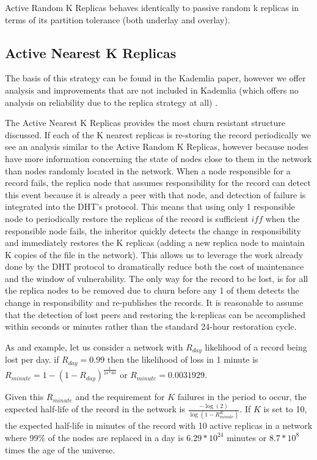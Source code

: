 \documentclass[conference]{IEEEtran}
\begin{document}
Active Random K Replicas behaves identically to passive random k replicas in terms of its partition tolerance (both underlay and overlay).





\subsection{Active Nearest K Replicas}
The basis of this strategy can be found in the Kademlia\cite{kademlia} paper, however we offer analysis and improvements that are not included in Kademlia (which offers no analysis on reliability due to the replica strategy at all)  .

The Active Nearest K Replicas provides the most churn resistant structure discussed. 
If each of the K nearest replicas is re-storing the record periodically we see an analysis similar to the Active Random K Replicas, however because nodes have more information concerning the state of nodes close to them in the network than nodes randomly located in the network.
When a node responsible for a record fails, the replica node that assumes responsibility for the record can detect this event because it is already a peer with that node, and detection of failure is integrated into the DHT's protocol.
This means that using only 1 responsible node to periodically restore the replicas of the record is sufficient $iff$ when the responsible node fails, the inheritor quickly detects the change in responsibility and immediately restores the K replicas (adding a new replica node to maintain K copies of the file in the network).
This allows us to leverage the work already done by the DHT protocol to dramatically reduce both the cost of maintenance and the window of vulnerability.
The only way for the record to be lost, is for all the replica nodes to be removed due to churn before any 1 of them detects the change in responsibility and re-publishes the records.
It is reasonable to assume that the detection of lost peers and restoring the k-replicas can be accomplished within seconds or minutes rather than the standard 24-hour restoration cycle.

As and example, let us consider a network with $R_{day}$ likelihood of a record being lost per day.
if $R_{day}=0.99$ then the likelihood of loss in 1 minute is $R_{minute} = 1-(1-R_{day})^{\frac{1}{24*60}}$ or $R_{minute} = 0.0031929$. 

Given this $R_{minute}$ and the requirement for $K$ failures in the period to occur,
the expected half-life of the record in the network is $\frac{-\log(2)}{\log(1-R_{minute}^{K})}$.
If $K$ is set to 10, the expected half-life in minutes of the record with 10 active replicas in a network where 99\% of the nodes are replaced in a day is $6.29*10^{24}$ minutes or $8.7*10^{8}$ times the age of the universe.
\end{document}
